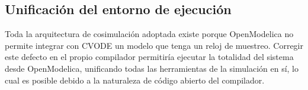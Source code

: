 \subsection{Unificación del entorno de ejecución}

Toda la arquitectura de cosimulación adoptada existe porque OpenModelica no permite integrar con CVODE un modelo que tenga un reloj de muestreo. Corregir este defecto en el propio compilador permitiría ejecutar la totalidad del sistema desde OpenModelica, unificando todas las herramientas de la simulación en sí, lo cual es posible debido a la naturaleza de código abierto del compilador.




